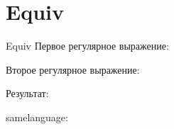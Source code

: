 \section{Equiv}
\begin{frame}{Equiv}
	Первое регулярное выражение:

	Второе регулярное выражение:

	Результат:

	samelanguage:


\end{frame}

